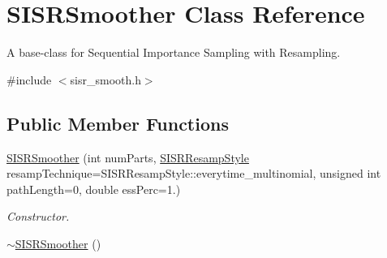 \hypertarget{classSISRSmoother}{}\section{S\+I\+S\+R\+Smoother Class Reference}
\label{classSISRSmoother}


A base-\/class for Sequential Importance Sampling with Resampling.  




{\ttfamily \#include $<$sisr\+\_\+smooth.\+h$>$}

\subsection*{Public Member Functions}
\begin{DoxyCompactItemize}
\item 
\hyperlink{classSISRSmoother_a1d2c23e5a42ad2529335126f8b5e744e}{S\+I\+S\+R\+Smoother} (int num\+Parts, \hyperlink{sisr__filter_8h_a2486051fd2028dedca520d3e0f8fd92f}{S\+I\+S\+R\+Resamp\+Style} resamp\+Technique=S\+I\+S\+R\+Resamp\+Style\+::everytime\+\_\+multinomial, unsigned int path\+Length=0, double ess\+Perc=1.)
\begin{DoxyCompactList}\small\item\em Constructor. \end{DoxyCompactList}\item 
\hyperlink{classSISRSmoother_a800ef5dc1cda37c7f0f0fd7f70ac0696}{$\sim$\+S\+I\+S\+R\+Smoother} ()\hypertarget{classSISRSmoother_a800ef5dc1cda37c7f0f0fd7f70ac0696}{}\label{classSISRSmoother_a800ef5dc1cda37c7f0f0fd7f70ac0696}


\end{DoxyCompactItemize}
